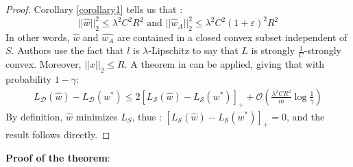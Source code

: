 \documentclass{article}
\begin{document}
    \begin{proof}
        Corollary \ref{corollary1} tells us that :
        \[
            ||\hat{w}||_2^2 
            \leq \lambda^2 C^2 R^2 \text{ and }
            ||\hat{w}_A||_2^2 
            \leq \lambda^2 C^2 (1+\varepsilon)^2 R^2
        \]
        In other words, $\hat{w}$ and $\hat{w_A}$ are contained 
        in a closed convex subset independent of $S$. Authors use the 
        fact that $l$ is $\lambda$-Lipschitz to say that $L$ is strongly 
        $\frac{1}{C}$-strongly convex. Moreover, $||x||_2 \leq R$. 
        A theorem in \cite{NIPS2008_3400} can be applied, giving that
        with probability $1-\gamma$:
        \begin{align*}
            L_{\mathcal{D}}(\hat{w}) - L_{\mathcal{D}}(w^*) 
            \leq 2 [L_{\mathcal{S}}(\hat{w}) - L_{\mathcal{S}}(w^*)]_+ 
            + \mathcal{O}\left( \frac{\lambda^2C R^2}{m} \log \frac{1}{\gamma}  \right)
        \end{align*} 
        By definition, $\hat{w}$ minimizes $L_S$, thus :
        $[L_{\mathcal{S}}(\hat{w}) - L_{\mathcal{S}}(w^*)]_+  = 0$, and the result follows 
        directly. 
    \end{proof}
\noindent \textbf{Proof of the theorem}:
\end{document}
